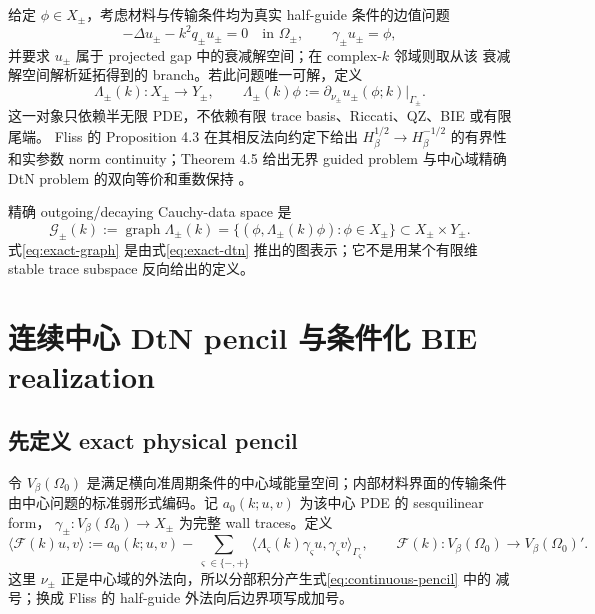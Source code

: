 \documentclass[UTF8,fontset=fandol,11pt,a4paper]{ctexart}
\newcommand{\cF}{\mathcal F}
\newcommand{\cG}{\mathcal G}
\begin{document}
给定 $\phi\in X_\pm$，考虑材料与传输条件均为真实 half-guide 条件的边值问题
\[
  -\Delta u_\pm-k^2q_\pm u_\pm=0\quad\text{in }\Omega_\pm,
  \qquad
  \gamma_\pm u_\pm=\phi,
\]
并要求 $u_\pm$ 属于 projected gap 中的衰减解空间；在 complex-$k$ 邻域则取从该
衰减解空间解析延拓得到的 branch。若此问题唯一可解，定义
\begin{equation}
  \Lambda_\pm(k):X_\pm\longrightarrow Y_\pm,
  \qquad
  \Lambda_\pm(k)\phi
  :=\partial_{\nu_\pm}u_\pm(\phi;k)\big|_{\Gamma_\pm}.
  \label{eq:exact-dtn}
\end{equation}
这一对象只依赖半无限 PDE，不依赖有限 trace basis、Riccati、QZ、BIE 或有限尾端。
Fliss 的 Proposition 4.3 在其相反法向约定下给出
$H_\beta^{1/2}\to H_\beta^{-1/2}$ 的有界性和实参数 norm continuity；Theorem 4.5
给出无界 guided problem 与中心域精确 DtN problem 的双向等价和重数保持
\cite{Fliss2013}。

精确 outgoing/decaying Cauchy-data space 是
\begin{equation}
  \cG_\pm(k)
  :=\operatorname{graph}\Lambda_\pm(k)
  =\{(\phi,\Lambda_\pm(k)\phi):\phi\in X_\pm\}
  \subset X_\pm\times Y_\pm.
  \label{eq:exact-graph}
\end{equation}
式\eqref{eq:exact-graph} 是由式\eqref{eq:exact-dtn} 推出的图表示；它不是用某个有限维
stable trace subspace 反向给出的定义。

\section{连续中心 DtN pencil 与条件化 BIE realization}

\subsection{先定义 exact physical pencil}

令 $V_\beta(\Omega_0)$ 是满足横向准周期条件的中心域能量空间；内部材料界面的传输条件
由中心问题的标准弱形式编码。记 $a_0(k;u,v)$ 为该中心 PDE 的 sesquilinear form，
$\gamma_\pm:V_\beta(\Omega_0)\to X_\pm$ 为完整 wall traces。定义
\begin{equation}
  \langle\cF(k)u,v\rangle
  :=a_0(k;u,v)
  -\sum_{\varsigma\in\{-,+\}}
   \langle\Lambda_\varsigma(k)\gamma_\varsigma u,
   \gamma_\varsigma v\rangle_{\Gamma_\varsigma},
  \qquad
  \cF(k):V_\beta(\Omega_0)\to V_\beta(\Omega_0)'.
  \label{eq:continuous-pencil}
\end{equation}
这里 $\nu_\pm$ 正是中心域的外法向，所以分部积分产生式\eqref{eq:continuous-pencil} 中的
减号；换成 Fliss 的 half-guide 外法向后边界项写成加号。
\end{document}
